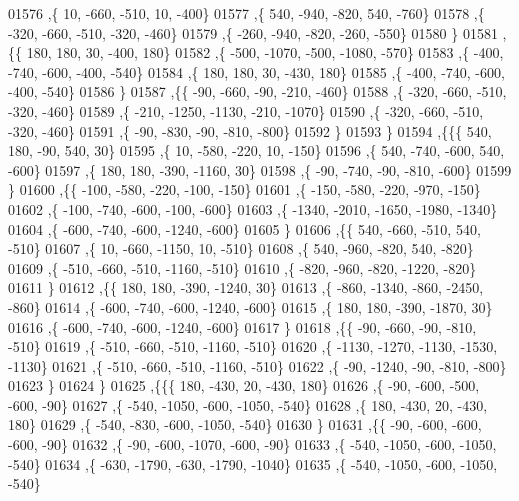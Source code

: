 \begin{DoxyCode}
01576     ,\{    10,  -660,  -510,    10,  -400\}
01577     ,\{   540,  -940,  -820,   540,  -760\}
01578     ,\{  -320,  -660,  -510,  -320,  -460\}
01579     ,\{  -260,  -940,  -820,  -260,  -550\}
01580     \}
01581    ,\{\{   180,   180,    30,  -400,   180\}
01582     ,\{  -500, -1070,  -500, -1080,  -570\}
01583     ,\{  -400,  -740,  -600,  -400,  -540\}
01584     ,\{   180,   180,    30,  -430,   180\}
01585     ,\{  -400,  -740,  -600,  -400,  -540\}
01586     \}
01587    ,\{\{   -90,  -660,   -90,  -210,  -460\}
01588     ,\{  -320,  -660,  -510,  -320,  -460\}
01589     ,\{  -210, -1250, -1130,  -210, -1070\}
01590     ,\{  -320,  -660,  -510,  -320,  -460\}
01591     ,\{   -90,  -830,   -90,  -810,  -800\}
01592     \}
01593    \}
01594   ,\{\{\{   540,   180,   -90,   540,    30\}
01595     ,\{    10,  -580,  -220,    10,  -150\}
01596     ,\{   540,  -740,  -600,   540,  -600\}
01597     ,\{   180,   180,  -390, -1160,    30\}
01598     ,\{   -90,  -740,   -90,  -810,  -600\}
01599     \}
01600    ,\{\{  -100,  -580,  -220,  -100,  -150\}
01601     ,\{  -150,  -580,  -220,  -970,  -150\}
01602     ,\{  -100,  -740,  -600,  -100,  -600\}
01603     ,\{ -1340, -2010, -1650, -1980, -1340\}
01604     ,\{  -600,  -740,  -600, -1240,  -600\}
01605     \}
01606    ,\{\{   540,  -660,  -510,   540,  -510\}
01607     ,\{    10,  -660, -1150,    10,  -510\}
01608     ,\{   540,  -960,  -820,   540,  -820\}
01609     ,\{  -510,  -660,  -510, -1160,  -510\}
01610     ,\{  -820,  -960,  -820, -1220,  -820\}
01611     \}
01612    ,\{\{   180,   180,  -390, -1240,    30\}
01613     ,\{  -860, -1340,  -860, -2450,  -860\}
01614     ,\{  -600,  -740,  -600, -1240,  -600\}
01615     ,\{   180,   180,  -390, -1870,    30\}
01616     ,\{  -600,  -740,  -600, -1240,  -600\}
01617     \}
01618    ,\{\{   -90,  -660,   -90,  -810,  -510\}
01619     ,\{  -510,  -660,  -510, -1160,  -510\}
01620     ,\{ -1130, -1270, -1130, -1530, -1130\}
01621     ,\{  -510,  -660,  -510, -1160,  -510\}
01622     ,\{   -90, -1240,   -90,  -810,  -800\}
01623     \}
01624    \}
01625   ,\{\{\{   180,  -430,    20,  -430,   180\}
01626     ,\{   -90,  -600,  -500,  -600,   -90\}
01627     ,\{  -540, -1050,  -600, -1050,  -540\}
01628     ,\{   180,  -430,    20,  -430,   180\}
01629     ,\{  -540,  -830,  -600, -1050,  -540\}
01630     \}
01631    ,\{\{   -90,  -600,  -600,  -600,   -90\}
01632     ,\{   -90,  -600, -1070,  -600,   -90\}
01633     ,\{  -540, -1050,  -600, -1050,  -540\}
01634     ,\{  -630, -1790,  -630, -1790, -1040\}
01635     ,\{  -540, -1050,  -600, -1050,  -540\}

\end{DoxyCode}
